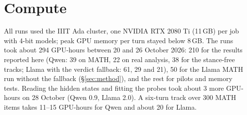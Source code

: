 \section{Compute}
\label{app:compute}
All runs used the IIIT Ada cluster, one NVIDIA RTX 2080 Ti (11\,GB) per job with 4-bit models; peak GPU memory per turn stayed below 8\,GB.
The runs took about 294 GPU-hours between 20 and 26 October 2026: 210 for the results reported here (Qwen: 39 on MATH, 22 on real analysis, 38 for the stance-free tracks; Llama with the verdict fallback: 61, 29 and 21), 50 for the Llama MATH run without the fallback (\S\ref{sec:method}), and the rest for pilots and memory tests.
Reading the hidden states and fitting the probes took about 3 more GPU-hours on 28 October (Qwen 0.9, Llama 2.0).
A six-turn track over 300 MATH items takes 11--15 GPU-hours for Qwen and about 20 for Llama.

